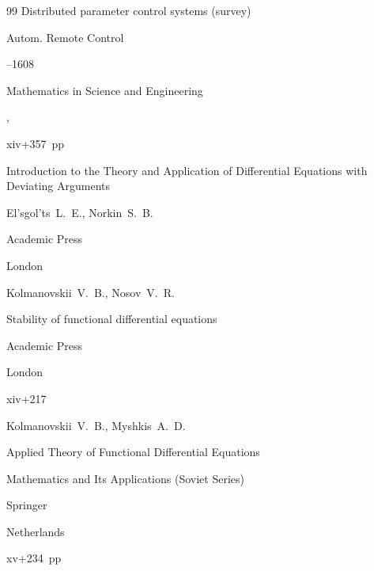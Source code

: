 \begin{thebibliography}{99}
\paper Distributed parameter control systems (survey)

\jour Autom. Remote Control




--1608







\serial Mathematics in Science and Engineering


,


xiv+357~pp 

\book Introduction to the Theory and Application of Differential Equations with Deviating Arguments

\by  El'sgol'ts~L.~E.,  Norkin~S.~B.

\publ Academic Press 

\publaddr London






\by Kolmanovskii~V.~B., Nosov~V.~R.

\book Stability of functional differential equations

\publ Academic Press

\publaddr London


\totalpages xiv+217







\by Kolmanovskii~V.~B., Myshkis~A.~D.

\book  Applied Theory of Functional Differential Equations

\serial Mathematics and Its Applications (Soviet Series)


\publ Springer 

\publaddr Netherlands


\totalpages xv+234~pp \nofrills








\end{thebibliography}
